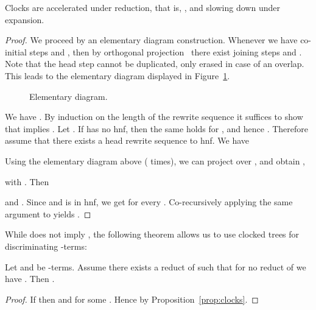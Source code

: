 \begin{proposition}\label{prop:clocks}
  Clocks are accelerated under reduction, 
  that is, , and slowing down under expansion.
\end{proposition}

\begin{proof}
  We proceed by an elementary diagram construction.
Whenever we have co-initial steps  and ,
  then by orthogonal projection~\cite{terese:2003}
  there exist joining steps  and .
  Note that the head step 
  cannot be duplicated, only erased in case of an overlap.
  This leads to the elementary diagram displayed in Figure~\ref{fig:elementary:diagram}.
\begin{figure}[ht!]
  \begin{center}
  \vspace{-2ex}
  \caption{Elementary diagram.}
  \vspace{-2ex}
  \label{fig:elementary:diagram}
  \end{center}
  \end{figure}

  We have .
  By induction on the length of the rewrite sequence 
  it suffices to show that  implies .
  Let .
  If  has no hnf, then the same holds for , and hence .
  Therefore assume that there exists a head rewrite sequence 
   to hnf.
  We have 

  Using the elementary diagram above ( times),
  we can project  over ,
  and obtain
  , 
  
  with .
  Then
  
  and .
  Since  and  is in hnf,
  we get  for every .
  Co-recursively applying the same argument to 
  yields .
\end{proof}

While  does not imply ,
the following theorem allows us to use clocked \bohm{} trees
for discriminating -terms:
\begin{theorem}\label{thm:general}
  Let  and  be -terms.
  Assume there exists a reduct  of 
  such that for no reduct  of  we have
  .
  Then .
\end{theorem}
\begin{proof}
  If  then  and 
  for some . Hence  by Proposition~\ref{prop:clocks}.
\end{proof}

